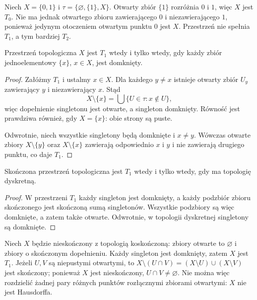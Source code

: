 \begin{przyklad}
\label{ex:topog-sierpinski-oddzielanie}
Niech $X=\{0,1\}$ i $\tau=\{\varnothing,\{1\},X\}$.
Otwarty zbiór $\{1\}$ rozróżnia $0$ i $1$, więc $X$ jest $T_0$.
Nie ma jednak otwartego zbioru zawierającego $0$ i niezawierającego
$1$, ponieważ jedynym otoczeniem otwartym punktu $0$ jest $X$.
Przestrzeń nie spełnia $T_1$, a tym bardziej $T_2$.
\end{przyklad}

\begin{twierdzenie}
\label{thm:topog-t1-singletony}
Przestrzeń topologiczna $X$ jest $T_1$ wtedy i tylko wtedy,
gdy każdy zbiór jednoelementowy $\{x\}$, $x\in X$, jest domknięty.
\end{twierdzenie}
\begin{proof}
Załóżmy $T_1$ i ustalmy $x\in X$. Dla każdego $y\ne x$
istnieje otwarty zbiór $U_y$ zawierający $y$ i niezawierający
$x$. Stąd
\[
X\setminus\{x\}=\bigcup\{U\in\tau:x\notin U\},
\]
więc dopełnienie singletonu jest otwarte, a singleton domknięty.
Równość jest prawdziwa również, gdy $X=\{x\}$: obie strony są puste.

Odwrotnie, niech wszystkie singletony będą domknięte i $x\ne y$.
Wówczas otwarte zbiory $X\setminus\{y\}$ oraz
$X\setminus\{x\}$ zawierają odpowiednio $x$ i $y$
i nie zawierają drugiego punktu, co daje $T_1$.
\end{proof}

\begin{wniosek}
\label{cor:topog-skonczone-t1}
Skończona przestrzeń topologiczna jest $T_1$ wtedy i tylko wtedy,
gdy ma topologię dyskretną.
\end{wniosek}
\begin{proof}
W przestrzeni $T_1$ każdy singleton jest domknięty, a każdy
podzbiór zbioru skończonego jest skończoną sumą singletonów.
Wszystkie podzbiory są więc domknięte, a zatem także otwarte.
Odwrotnie, w topologii dyskretnej singletony są domknięte.
\end{proof}

\begin{przyklad}
\label{ex:topog-koskonczona-t1-nie-t2}
Niech $X$ będzie nieskończony z topologią koskończoną:
zbiory otwarte to $\varnothing$ i zbiory o skończonym dopełnieniu.
Każdy singleton jest domknięty, zatem $X$ jest $T_1$.
Jeżeli $U,V$ są niepustymi otwartymi, to
$X\setminus(U\cap V)=(X\setminus U)\cup(X\setminus V)$
jest skończony; ponieważ $X$ jest nieskończony,
$U\cap V\ne\varnothing$. Nie można więc rozdzielić
żadnej pary różnych punktów rozłącznymi zbiorami otwartymi:
$X$ nie jest Hausdorffa.
\end{przyklad}

